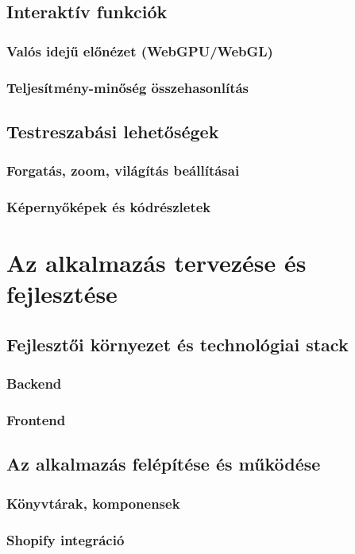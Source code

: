 \documentclass[12pt]{report}
\begin{document}
        \section{Interaktív funkciók}
        \subsection{Valós idejű előnézet (WebGPU/WebGL)}
        \subsection{Teljesítmény-minőség összehasonlítás}
        \section{Testreszabási lehetőségek}
        \subsection{Forgatás, zoom, világítás beállításai}
        \subsection{Képernyőképek és kódrészletek}

        \chapter{Az alkalmazás tervezése és fejlesztése}
        \section{Fejlesztői környezet és technológiai stack}
        \subsection{Backend}
        \subsection{Frontend}
        \section{Az alkalmazás felépítése és működése}
        \subsection{Könyvtárak, komponensek}
        \subsection{Shopify integráció}
\end{document}
